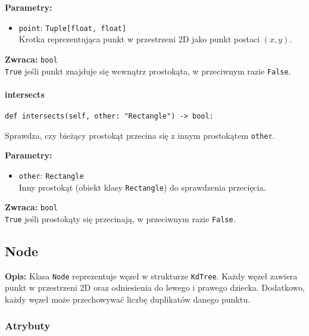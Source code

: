 \documentclass[12pt]{article}
\begin{document}
\noindent\textbf{Parametry:}
\begin{itemize}
    \item \texttt{point}: \texttt{Tuple[float, float]} \\
    Krotka reprezentująca punkt w przestrzeni 2D jako punkt postaci \((x, y)\).
\end{itemize}

\textbf{Zwraca:} 
\texttt{bool} \\
\texttt{True} jeśli punkt znajduje się wewnątrz prostokąta, w przeciwnym razie \texttt{False}.

\paragraph{intersects}

\begin{verbatim}
def intersects(self, other: "Rectangle") -> bool:
\end{verbatim}

\noindent Sprawdza, czy bieżący prostokąt przecina się z innym prostokątem \texttt{other}.

\noindent\textbf{Parametry:}
\begin{itemize}
    \item \texttt{other}: \texttt{Rectangle} \\
    Inny prostokąt (obiekt klasy \texttt{Rectangle}) do sprawdzenia przecięcia.
\end{itemize}

\textbf{Zwraca:} 
\texttt{bool} \\
\texttt{True} jeśli prostokąty się przecinają, w przeciwnym razie \texttt{False}.

\subsection{Node}

\textbf{Opis:} Klasa \texttt{Node} reprezentuje węzeł w strukturze \texttt{KdTree}. Każdy węzeł zawiera punkt w przestrzeni 2D oraz odniesienia do lewego i prawego dziecka. Dodatkowo, każdy węzeł może przechowywać liczbę duplikatów danego punktu.

\subsubsection{Atrybuty}
\end{document}
